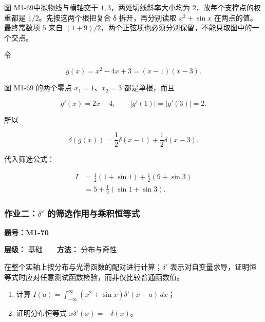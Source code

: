 图 M1-69中抛物线与横轴交于 \(1,3\)，两处切线斜率大小均为
\(2\)，故每个支撑点的权重都是 \(1/2\)。先按这两个根把复合 δ
拆开，再分别读取 \(x^2+\sin x\) 在两点的值。最终常数项 \(5\) 来自
\((1+9)/2\)，两个正弦项也必须分别保留，不能只取图中的一个交点。

令

\[
g(x)=x^2-4x+3=(x-1)(x-3).
\]

图 M1-69 的两个零点 \(x_1=1\)、\(x_2=3\) 都是单根，而且

\[
g'(x)=2x-4,
\qquad
|g'(1)|=|g'(3)|=2.
\]

所以

\[
\delta(g(x))
=
\frac12\delta(x-1)
+
\frac12\delta(x-3).
\]

代入筛选公式：

\[
\begin{aligned}
I
&=
\frac12(1+\sin 1)
+
\frac12(9+\sin 3)\\
&=
\boxed{
5+\frac12(\sin 1+\sin 3)
}.
\end{aligned}
\]

\par{}
\noindent\begin{minipage}{\linewidth}

\subsubsection{\texorpdfstring{作业二：\(\delta'\)
的筛选作用与乘积恒等式}{作业二：\textbackslash delta\textquotesingle{} 的筛选作用与乘积恒等式}}\label{m1:ux4f5cux4e1aux4e8cdelta-ux7684ux7b5bux9009ux4f5cux7528ux4e0eux4e58ux79efux6052ux7b49ux5f0f}

\textbf{题号：M1-70}

\textbf{层级：} 基础　　\textbf{方法：} 分布与奇性

在整个实轴上按分布与光滑函数的配对进行计算；\(\delta'\)
表示对自变量求导，证明恒等式时应对任意测试函数检验，而非仅比较普通函数值。

\begin{enumerate}
\def\labelenumi{\arabic{enumi}.}
\tightlist
\item
  计算
  \(\displaystyle I(a)=\int_{-\infty}^{\infty}(x^2+\sin x)\delta'(x-a)\,dx\)；
\item
  证明分布恒等式 \(\displaystyle x\delta'(x)=-\delta(x)\)。
\end{enumerate}


\end{minipage}\par

